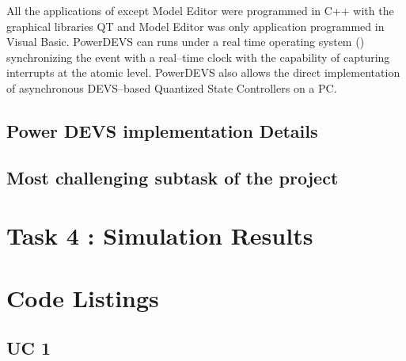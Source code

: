 \documentclass[titlepage]{article}%
\begin{document}
All the applications of \pd except Model Editor were programmed in C++ with the graphical libraries QT and Model Editor was only application programmed in Visual Basic. PowerDEVS can runs under a real time operating system (\cite{ManRTI}) synchronizing the event with a real–time clock with the capability of capturing interrupts at the atomic level. PowerDEVS also allows the direct implementation of asynchronous DEVS–based Quantized State Controllers \cite{Kof03b} on a PC.




\subsection{Power DEVS implementation Details}
\subsection{Most challenging subtask of the project}




\section{Task 4 : Simulation Results}






\newpage
\appendix

\section{Code Listings}

\subsection{UC 1}
\end{document}

